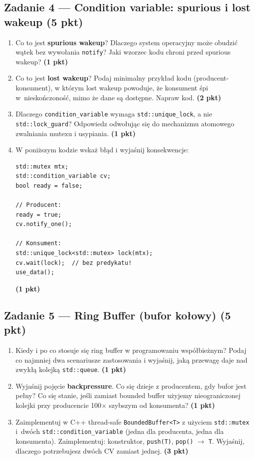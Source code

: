 \documentclass[11pt,a4paper]{article}
\newcommand{\pkt}[1]{\hfill\textbf{(#1 pkt)}}
\begin{document}
\subsection*{Zadanie 4 --- Condition variable: spurious i lost wakeup \pkt{5}}

\begin{enumerate}[label=(\alph*)]
\item Co to jest \textbf{spurious wakeup}? Dlaczego system operacyjny może obudzić wątek bez wywołania \texttt{notify}? Jaki wzorzec kodu chroni przed spurious wakeup? \pkt{1}

\item Co to jest \textbf{lost wakeup}? Podaj minimalny przykład kodu (producent-konsument), w którym lost wakeup powoduje, że konsument śpi w~nieskończoność, mimo że dane są dostępne. Napraw kod. \pkt{2}

\item Dlaczego \texttt{condition\_variable} wymaga \texttt{std::unique\_lock}, a nie \texttt{std::lock\_guard}? Odpowiedz odwołując się do mechanizmu atomowego zwalniania mutexu i usypiania. \pkt{1}

\item W poniższym kodzie wskaż błąd i wyjaśnij konsekwencje:
\begin{lstlisting}
std::mutex mtx;
std::condition_variable cv;
bool ready = false;

// Producent:
ready = true;
cv.notify_one();

// Konsument:
std::unique_lock<std::mutex> lock(mtx);
cv.wait(lock);  // bez predykatu!
use_data();
\end{lstlisting}
\pkt{1}
\end{enumerate}

\subsection*{Zadanie 5 --- Ring Buffer (bufor kołowy) \pkt{5}}

\begin{enumerate}[label=(\alph*)]
\item Kiedy i po co stosuje się ring buffer w programowaniu współbieżnym? Podaj co najmniej dwa scenariusze zastosowania i wyjaśnij, jaką przewagę daje nad zwykłą kolejką \texttt{std::queue}. \pkt{1}

\item Wyjaśnij pojęcie \textbf{backpressure}. Co się dzieje z producentem, gdy bufor jest pełny? Co się stanie, jeśli zamiast bounded buffer użyjemy nieograniczonej kolejki przy producencie 100$\times$ szybszym od konsumenta? \pkt{1}

\item Zaimplementuj w C++ thread-safe \texttt{BoundedBuffer<T>} z użyciem \texttt{std::mutex} i~dwóch \texttt{std::condition\_variable} (jedna dla producenta, jedna dla konsumenta). Zaimplementuj: konstruktor, \texttt{push(T)}, \texttt{pop()} $\to$ \texttt{T}. Wyjaśnij, dlaczego potrzebujesz dwóch CV zamiast jednej. \pkt{3}
\end{enumerate}
\end{document}
